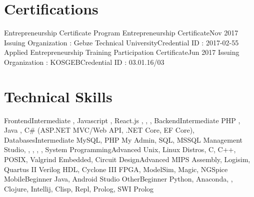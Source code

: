 \documentclass{main} %
\begin{document}
\section{Certifications}
    \resumeSubHeadingListStart
        \resumeSubheading
            {Entrepreneurship Certificate Program Entrepreneurship Certificate}{Nov 2017}
            {Issuing Organization : Gebze Technical University}{Credential ID : 2017-02-55}
        \resumeSubheading
            {Applied Entrepreneurship Training Participation Certificate}{Jun 2017}
            {Issuing Organization : KOSGEB}{Credential ID : 03.01.16/03}
    \resumeSubHeadingListEnd

\section{Technical Skills}
    \resumeSubHeadingListStart %
        \resumeSubheading
            {Frontend}{Intermediate} %
            {{}, Javascript {}, React.js {}, {}, {}, {}}{}
        \resumeSubheading
            {Backend}{Intermediate} %
            {PHP {}, Java {}, C\# (ASP.NET MVC/Web API, .NET Core, EF Core), {}}{}
        \resumeSubheading
            {Databases}{Intermediate} %
            {MySQL, PHP My Admin, SQL, MSSQL Management Studio, {}, {}, {}, {}, {}}{}
        \resumeSubheading
            {System Programming}{Advanced}
            {Unix, Linux Distros, C, C++, POSIX, Valgrind}{}
        \resumeSubheading
            {Embedded, Circuit Design}{Advanced}
            {MIPS Assembly, Logisim, Quartus II Verilog HDL, Cyclone III FPGA, ModelSim, Magic, NGSpice}{}
        \resumeSubheading
            {Mobile}{Beginner}
            {Java, Android Studio}{}
        \resumeSubheading
            {Other}{Beginner}
            {Python, Anaconda, {}, Clojure, Intellij, Clisp, Repl, Prolog, SWI Prolog}{}
    \resumeSubHeadingListEnd
\end{document}
